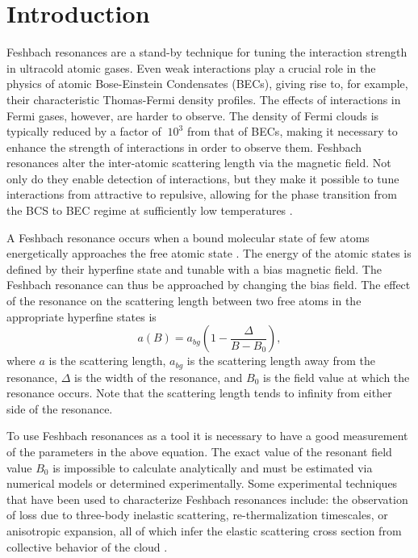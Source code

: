 \documentclass[12pt]{iopart}
\begin{document}
\section{Introduction}
Feshbach resonances are a stand-by technique for tuning the interaction strength in ultracold atomic gases. Even weak interactions play a crucial role in the physics of atomic Bose-Einstein Condensates (BECs), giving rise to, for example, their characteristic Thomas-Fermi density profiles. The effects of interactions in Fermi gases, however, are harder to observe. The density of Fermi clouds is typically reduced by a factor of $~10^3$ from that of BECs, making it necessary to enhance the strength of interactions in order to observe them. Feshbach resonances alter the inter-atomic scattering length via the magnetic field. Not only do they enable detection of interactions, but they make it possible to tune interactions from attractive to repulsive, allowing for the phase transition from the BCS to BEC regime at sufficiently low temperatures \cite{RegalThesis}. 
\par A Feshbach resonance occurs when a bound molecular state of few atoms energetically approaches the free atomic state \cite{Chin10}. The energy of the atomic states is defined by their hyperfine state and tunable with a bias magnetic field. The Feshbach resonance can thus be approached by changing the bias field. The effect of the resonance on the scattering length between two free atoms in the appropriate hyperfine states is
\begin{equation}
a(B)=a_{bg}\left(1-\frac{\Delta}{B-B_0}\right),
\label{feshbachEq}
\end{equation}
where $a$ is the scattering length, $a_{bg}$ is the scattering length away from the resonance, $\Delta$ is the width of the resonance, and $B_0$ is the field value at which the resonance occurs. Note that the scattering length tends to infinity from either side of the resonance.
\par To use Feshbach resonances as a tool it  is necessary to have a good measurement of the parameters in the above equation.  The exact value of the resonant field value $B_0$ is impossible to calculate analytically and must be estimated via numerical models \cite{Lysebo09, Gao11} or determined experimentally. Some experimental techniques that have been used to characterize Feshbach resonances include: the observation of loss due to three-body inelastic scattering, re-thermalization timescales, or anisotropic expansion, all of which infer the elastic scattering cross section from collective behavior of the cloud \cite{Regal03,OHara02,Monroe93}. 
\end{document}
